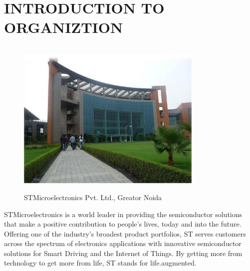 \chapter{INTRODUCTION TO ORGANIZTION}
\begin{figure}[ht]
	\centering
	\includegraphics[width=3.5in, height=3in]{images/company.jpg}
	\caption{STMicroelectronics Pvt. Ltd., Greator Noida}
\end{figure}
\noindent STMicroelectronics is a world leader in providing the semiconductor solutions that make a positive contribution to people's lives, today and into the future.\\
\noindent Offering one of the industry's broadest product portfolios, ST serves customers across the spectrum of electronics applications with innovative semiconductor solutions for Smart Driving and the Internet of Things. By getting more from technology to get more from life, ST stands for life.augmented.
